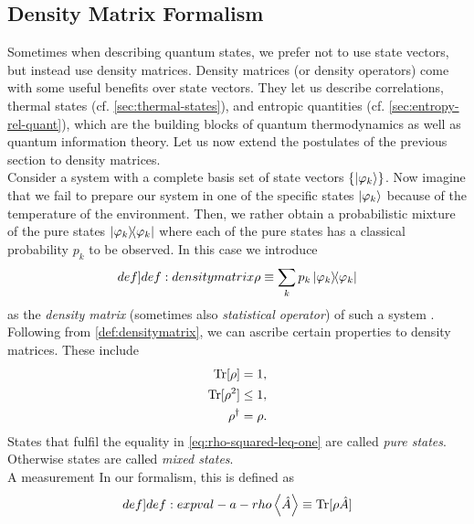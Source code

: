 \documentclass{book}
\numberwithin{equation}{section} %
\begin{document}
\subsection{Density Matrix Formalism}\label{sec:densitymatrix}
Sometimes when describing quantum states, we prefer not to use state vectors, but instead use density matrices.
Density matrices (or density operators) come with some useful benefits over state vectors.
They let us describe correlations, thermal states (cf. \cref{sec:thermal-states}), and entropic quantities (cf. \cref{sec:entropy-rel-quant}), which
are the building blocks of quantum thermodynamics as well as quantum information theory.
Let us now extend the postulates of the previous section to density matrices.\\
Consider a system with a complete basis set of state vectors $\{\ket{\varphi_k}\}$. 
Now imagine that we fail to prepare our system in one of the specific states $\ket{\varphi_k}$ because of the temperature of the environment.
Then, we rather obtain a probabilistic mixture of the pure states $\dyad{\varphi_k}$ where each of the pure states has a classical probability $p_k$ to be observed.
In this case we introduce
\begin{align}\label[def]{def:densitymatrix}
    \rho \equiv \sum\limits_kp_k\dyad{\varphi_k}
\end{align}
as the \emph{density matrix} (sometimes also \emph{statistical operator}) of such a system \cite{BA_breuer2002theory}. \\
Following from \cref{def:densitymatrix}, we can ascribe certain properties to density matrices. These include
\begin{align}
    \Trace[\rho] &= 1,\label{eq:rho-trace-one}\\
    \Trace[\rho^2] &\leq 1,\label{eq:rho-squared-leq-one}\\
    \rho^\dagger &= \rho.\label{eq:rho-hermitian}
\end{align}
States that fulfil the equality in \cref{eq:rho-squared-leq-one} are called \emph{pure states}. Otherwise states are called \emph{mixed states}.\\
A measurement 
In our formalism, this is defined as
\begin{align}\label[def]{def:expval-a-rho}
    \expval{\hat{A}} \equiv \Trace[\rho \hat{A}]
\end{align}
\end{document}
